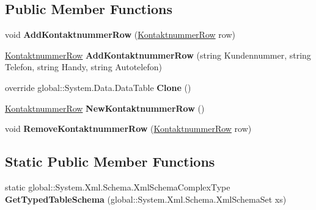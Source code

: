 \subsection*{Public Member Functions}
\begin{DoxyCompactItemize}
\item 
void {\bfseries Add\+Kontaktnummer\+Row} (\hyperlink{class_products_1_1_data_1_1ds_sage_1_1_kontaktnummer_row}{Kontaktnummer\+Row} row)\hypertarget{class_products_1_1_data_1_1ds_sage_1_1_kontaktnummer_data_table_a19cbb0e7d9c99b5a1a26a060dc66c5df}{}\label{class_products_1_1_data_1_1ds_sage_1_1_kontaktnummer_data_table_a19cbb0e7d9c99b5a1a26a060dc66c5df}

\item 
\hyperlink{class_products_1_1_data_1_1ds_sage_1_1_kontaktnummer_row}{Kontaktnummer\+Row} {\bfseries Add\+Kontaktnummer\+Row} (string Kundennummer, string Telefon, string Handy, string Autotelefon)\hypertarget{class_products_1_1_data_1_1ds_sage_1_1_kontaktnummer_data_table_af527511aa553f466641c10909e3c40e4}{}\label{class_products_1_1_data_1_1ds_sage_1_1_kontaktnummer_data_table_af527511aa553f466641c10909e3c40e4}

\item 
override global\+::\+System.\+Data.\+Data\+Table {\bfseries Clone} ()\hypertarget{class_products_1_1_data_1_1ds_sage_1_1_kontaktnummer_data_table_a743756cb041c27dc91ac7bddf035a3f1}{}\label{class_products_1_1_data_1_1ds_sage_1_1_kontaktnummer_data_table_a743756cb041c27dc91ac7bddf035a3f1}

\item 
\hyperlink{class_products_1_1_data_1_1ds_sage_1_1_kontaktnummer_row}{Kontaktnummer\+Row} {\bfseries New\+Kontaktnummer\+Row} ()\hypertarget{class_products_1_1_data_1_1ds_sage_1_1_kontaktnummer_data_table_a1931d75e0131ccab5432870ce64d811c}{}\label{class_products_1_1_data_1_1ds_sage_1_1_kontaktnummer_data_table_a1931d75e0131ccab5432870ce64d811c}

\item 
void {\bfseries Remove\+Kontaktnummer\+Row} (\hyperlink{class_products_1_1_data_1_1ds_sage_1_1_kontaktnummer_row}{Kontaktnummer\+Row} row)\hypertarget{class_products_1_1_data_1_1ds_sage_1_1_kontaktnummer_data_table_a07e91cddd47677e0192de7c124d6c07f}{}\label{class_products_1_1_data_1_1ds_sage_1_1_kontaktnummer_data_table_a07e91cddd47677e0192de7c124d6c07f}

\end{DoxyCompactItemize}
\subsection*{Static Public Member Functions}
\begin{DoxyCompactItemize}
\item 
static global\+::\+System.\+Xml.\+Schema.\+Xml\+Schema\+Complex\+Type {\bfseries Get\+Typed\+Table\+Schema} (global\+::\+System.\+Xml.\+Schema.\+Xml\+Schema\+Set xs)\hypertarget{class_products_1_1_data_1_1ds_sage_1_1_kontaktnummer_data_table_a8e164ca59f9843d2ead4b3e18b8b0f07}{}\label{class_products_1_1_data_1_1ds_sage_1_1_kontaktnummer_data_table_a8e164ca59f9843d2ead4b3e18b8b0f07}

\end{DoxyCompactItemize}
